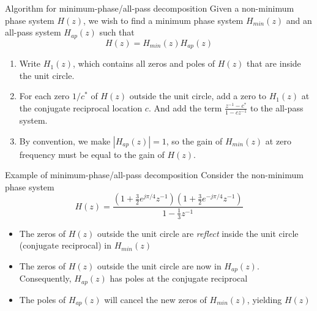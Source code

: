 \documentclass[10pt]{beamer}
\begin{document}
%
\begin{frame}{Algorithm for minimum-phase/all-pass decomposition}
Given a non-minimum phase system $H(z)$, we wish to find a minimum phase system $H_{min}(z)$ and an all-pass system $H_{ap}(z)$ such that
\begin{equation*}
H(z) = H_{min}(z)H_{ap}(z)
\end{equation*}
\begin{enumerate}
	\item Write $H_1(z)$, which contains all zeros and poles of $H(z)$ that are inside the unit circle.
	\item For each zero $1/c^*$ of $H(z)$ outside the unit circle, add a zero to $H_1(z)$ at the conjugate reciprocal location $c$. And add the term $\frac{z^{-1} - c^*}{1 - cz^{-1}}$ to the all-pass system.
	\item By convention, we make $|H_{ap}(z)| = 1$, so the gain of $H_{min}(z)$ at zero frequency must be equal to the gain of $H(z)$.
\end{enumerate}
\end{frame}

\begin{frame}{Example of minimum-phase/all-pass decomposition}
Consider the non-minimum phase system
\begin{equation*}
H(z) = \frac{(1 + \frac{3}{2}e^{j\pi/4}z^{-1})(1 + \frac{3}{2}e^{-j\pi/4}z^{-1})}{1 - \frac{1}{3}z^{-1}}
\end{equation*}

\hspace*{-0.85cm}\resizebox{0.95\paperwidth}{!}{}
\begin{itemize}
	\item The zeros of $H(z)$ outside the unit circle are \textit{reflect} inside the unit circle (conjugate reciprocal) in $H_{min}(z)$
	\item The zeros of $H(z)$ outside the unit circle are now in $H_{ap}(z)$. Consequently, $H_{ap}(z)$ has poles at the conjugate reciprocal
	\item The poles of $H_{ap}(z)$ will cancel the new zeros of $H_{min}(z)$, yielding $H(z)$
\end{itemize}

\end{frame}
\end{document}
